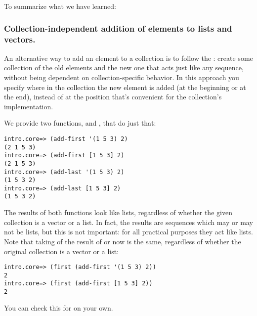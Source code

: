 To summarize what we have learned: 


\subsubsection{Collection-independent addition of elements to lists and vectors. }\label{subsubsec:add-first-last}
An alternative way to add an element to a collection is to follow the : create some collection of the old elements and the new one that acts just like any sequence, without being dependent on collection-specific behavior. In this approach you specify where in the collection the new element is added (at the beginning or at the end), instead of at the position that's convenient for the collection's implementation. 

We provide two functions,  and , that do just that: 
\begin{framed}
\begin{verbatim}
intro.core=> (add-first '(1 5 3) 2)
(2 1 5 3)
intro.core=> (add-first [1 5 3] 2)
(2 1 5 3)
intro.core=> (add-last '(1 5 3) 2)
(1 5 3 2)
intro.core=> (add-last [1 5 3] 2)
(1 5 3 2)
\end{verbatim}
\end{framed}
The results of both functions look like lists, regardless of whether the given collection is a vector or a list. In fact, the results are sequences which may or may not be lists, but this is not important: for all practical purposes they act like lists.  Note that taking  of the result of  or  now is the same, regardless of whether the original collection is a vector or a list:
\begin{framed}
\begin{verbatim}
intro.core=> (first (add-first '(1 5 3) 2))
2
intro.core=> (first (add-first [1 5 3] 2))
2
\end{verbatim}
\end{framed}
You can check this for  on your own. 

